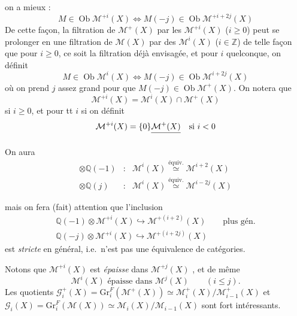 \documentclass[11pt,a4paper]{article}
\begin{document}
on a mieux :
\[
  M \in \operatorname{Ob} \mathcal{M}^{+i}(X) \Longleftrightarrow
  M(-j) \in \operatorname{Ob} \mathcal{M}^{+i+2j}(X)
\]
De cette façon, la filtration de $\mathcal{M}^{+}(X)$ par les
$\mathcal{M}^{+i}(X)$ ($i \geqslant 0$) peut se prolonger en une filtration
de $\mathcal{M}(X)$ par des $\mathcal{M}^{i}(X)$ ($i \in \mathbb{Z}$) de telle
façon que pour $i \geqslant 0$, ce soit la filtration déjà
 envisagée, et pour $i$ quelconque, on définit
\[
  M \in \operatorname{Ob} \mathcal{M}^{i}(X) \Longleftrightarrow
  M(-j) \in \operatorname{Ob} \mathcal{M}^{i+2j}(X)
\]
où on prend $j$ assez grand pour que
$M(-j) \in \operatorname{Ob} \mathcal{M}^{+}(X)$. On notera que
\[
  \mathcal{M}^{+i}(X) = \mathcal{M}^{i}(X) \cap \mathcal{M}^{+}(X)
\]
si $i \geqslant 0$, et pour tt $i$ si on définit
\[
  \mathcal{M}^{+i}(X) = \{0\} \struck{\mathcal{M}^{+}(X)} \quad \text{si } i < 0
\]

On aura
\[
  \begin{array}{rcl}
    \otimes \mathbb{Q}(-1) & : & \mathcal{M}^{i}(X) \overset{\text{équiv.}}{\simeq} \mathcal{M}^{i+2}(X) \\
    \otimes \mathbb{Q}(j) & : & \mathcal{M}^{i}(X) \overset{\text{équiv.}}{\simeq} \mathcal{M}^{i-2j}(X)
  \end{array}
\]

mais on fera (fait) attention que l'inclusion
\[
  \begin{array}{l}
    \mathbb{Q}(-1) \otimes \mathcal{M}^{+i}(X) \hookrightarrow \mathcal{M}^{+(i+2)}(X) \qquad \text{plus gén.} \\
    \mathbb{Q}(-j) \otimes \mathcal{M}^{+i}(X) \hookrightarrow \mathcal{M}^{+(i+2j)}(X)
  \end{array}
\]
est \emph{stricte} en général, i.e.\ n'est pas une équivalence de catégories.

Notons que $\mathcal{M}^{+i}(X)$ est \emph{épaisse} dans $\mathcal{M}^{+j}(X)$
, et de même
\[
  \mathcal{M}^{i}(X) \text{ épaisse dans } \mathcal{M}^{j}(X) \qquad (i \leqslant j).
\]
Les quotients
$\mathcal{G}^{+}_{i}(X) = \mathrm{Gr}^{F}_{i}(\mathcal{M}^{+}(X)) \simeq
\mathcal{M}^{+}_{i}(X)/\mathcal{M}^{+}_{i-1}(X)$ et
$\mathcal{G}_{i}(X) = \mathrm{Gr}^{F}_{i}(\mathcal{M}(X)) \simeq
\mathcal{M}_{i}(X)/\mathcal{M}_{i-1}(X)$ sont fort intéressants.
\end{document}
